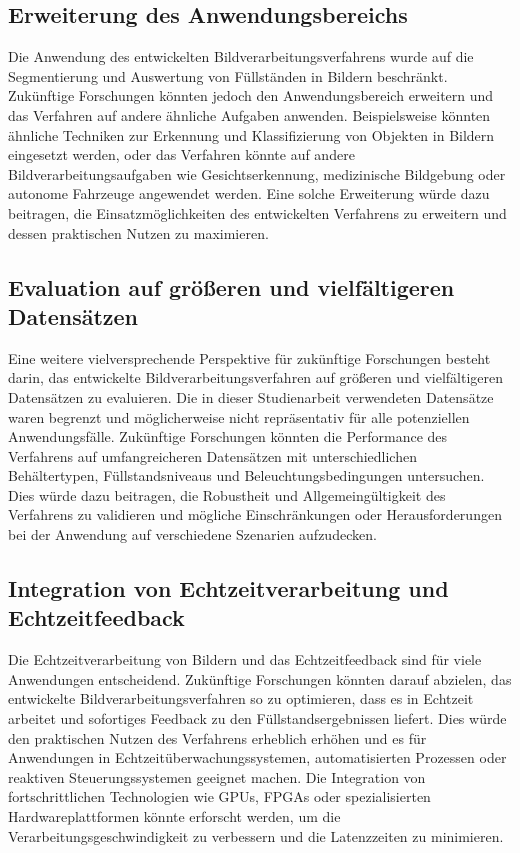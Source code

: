 \subsection{Erweiterung des Anwendungsbereichs}

Die Anwendung des entwickelten Bildverarbeitungsverfahrens wurde auf die Segmentierung und Auswertung von Füllständen in Bildern beschränkt. Zukünftige Forschungen könnten jedoch den Anwendungsbereich erweitern und das Verfahren auf andere ähnliche Aufgaben anwenden. Beispielsweise könnten ähnliche Techniken zur Erkennung und Klassifizierung von Objekten in Bildern eingesetzt werden, oder das Verfahren könnte auf andere Bildverarbeitungsaufgaben wie Gesichtserkennung, medizinische Bildgebung oder autonome Fahrzeuge angewendet werden. Eine solche Erweiterung würde dazu beitragen, die Einsatzmöglichkeiten des entwickelten Verfahrens zu erweitern und dessen praktischen Nutzen zu maximieren.

\subsection{Evaluation auf größeren und vielfältigeren Datensätzen}

Eine weitere vielversprechende Perspektive für zukünftige Forschungen besteht darin, das entwickelte Bildverarbeitungsverfahren auf größeren und vielfältigeren Datensätzen zu evaluieren. Die in dieser Studienarbeit verwendeten Datensätze waren begrenzt und möglicherweise nicht repräsentativ für alle potenziellen Anwendungsfälle. Zukünftige Forschungen könnten die Performance des Verfahrens auf umfangreicheren Datensätzen mit unterschiedlichen Behältertypen, Füllstandsniveaus und Beleuchtungsbedingungen untersuchen. Dies würde dazu beitragen, die Robustheit und Allgemeingültigkeit des Verfahrens zu validieren und mögliche Einschränkungen oder Herausforderungen bei der Anwendung auf verschiedene Szenarien aufzudecken.

\subsection{Integration von Echtzeitverarbeitung und Echtzeitfeedback}

Die Echtzeitverarbeitung von Bildern und das Echtzeitfeedback sind für viele Anwendungen entscheidend. Zukünftige Forschungen könnten darauf abzielen, das entwickelte Bildverarbeitungsverfahren so zu optimieren, dass es in Echtzeit arbeitet und sofortiges Feedback zu den Füllstandsergebnissen liefert. Dies würde den praktischen Nutzen des Verfahrens erheblich erhöhen und es für Anwendungen in Echtzeitüberwachungssystemen, automatisierten Prozessen oder reaktiven Steuerungssystemen geeignet machen. Die Integration von fortschrittlichen Technologien wie GPUs, FPGAs oder spezialisierten Hardwareplattformen könnte erforscht werden, um die Verarbeitungsgeschwindigkeit zu verbessern und die Latenzzeiten zu minimieren.

